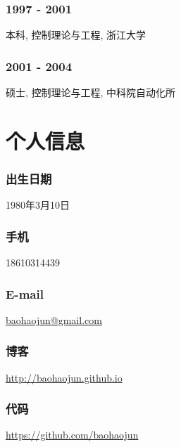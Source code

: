\documentclass[11pt,dvipdfmx,CJKbookmarks]{article}
\begin{document}
\begin{CJK*}{UTF8}{simsun}
\subsubsection{1997 - 2001}
\label{sec-4-0-1}
本科, 控制理论与工程, 浙江大学
\subsubsection{2001 - 2004}
\label{sec-4-0-2}
硕士, 控制理论与工程, 中科院自动化所

\section{个人信息}
\label{sec-5}
\subsubsection{出生日期}
\label{sec-5-0-1}
1980年3月10日
\subsubsection{手机}
\label{sec-5-0-2}
18610314439
\subsubsection{E-mail}
\label{sec-5-0-3}
\href{mailto:baohaojun@gmail.com}{baohaojun@gmail.com}
\subsubsection{博客}
\label{sec-5-0-4}
\url{http://baohaojun.github.io}
\subsubsection{代码}
\label{sec-5-0-5}
\url{https://github.com/baohaojun}


\end{CJK*}
\end{document}
